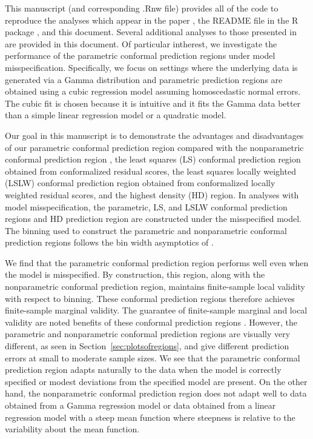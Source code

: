 \documentclass[11pt]{article}\usepackage[]{graphicx}\usepackage[]{color}
\begin{document}
This manuscript (and corresponding .Rnw file) provides all of the code to 
reproduce the analyses which appear in the paper \citet{eck2019conformal}, the 
README file in the R package \citet{eck2018conformalR}, and this document.  
Several additional analyses to those presented in 
\citet{eck2019conformal} are provided in this document.  
Of particular intherest, we investigate the performance of the parametric 
conformal prediction regions under model misspecification.  
Specifically, we focus on settings where the underlying data is generated 
via a Gamma distribution and parametric prediction regions are obtained using a 
cubic regression model assuming homoscedastic normal errors.  The cubic fit is 
chosen because it is intuitive and it fits the Gamma data better than a simple 
linear regression model or a quadratic model.  

Our goal in this manuscript is to demonstrate the advantages and disadvantages 
of our parametric conformal prediction region \citep{eck2019conformal} 
compared with the nonparametric conformal prediction region 
\citep{lei2014distribution}, the least squares (LS) conformal prediction 
region \citep{lei2018distribution} obtained from conformalized residual scores, 
the least squares locally weighted (LSLW) conformal prediction region 
\citep[Section 5.2]{lei2018distribution} obtained from conformalized locally 
weighted residual scores, and the highest density (HD) region. In analyses 
with model misspecification, the parametric, LS, and LSLW conformal prediction 
regions and HD prediction region are constructed under the misspecified 
model.  The binning used to construct the parametric and 
nonparametric conformal prediction regions follows the bin width asymptotics 
of \citet{lei2014distribution}.

We find that the parametric conformal prediction 
region performs well even when the model is misspecified.  By construction, 
this region, along with the nonparametric conformal prediction region, 
maintains finite-sample local validity with respect to binning.  
These conformal prediction regions therefore achieves finite-sample marginal 
validity.  The guarantee of finite-sample marginal and local validity are 
noted benefits of these conformal prediction regions 
\citep{lei2014distribution, eck2019conformal}.  
However, the parametric and nonparametric conformal prediction regions are 
visually very different, as seen in Section~\ref{sec:plotsofregions}, and 
give different prediction errors at small to moderate sample sizes.  
We see that the parametric conformal prediction region adapts naturally 
to the data when the model is correctly specified or modest deviations 
from the specified model are present.  On the other hand, the 
nonparametric conformal prediction region does not adapt well to 
data obtained from a Gamma regression model or data obtained from a 
linear regression model with a steep mean function where steepness is 
relative to the variability about the mean function.
\end{document}
